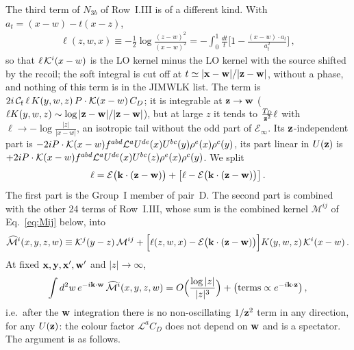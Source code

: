 The third term of $N_{3b}$ of Row~I.III is of a different kind. With $a_t=(x-w)-t(x-z)$,
\begin{align}\label{eq:ell}
\ell(z,w,x)\equiv-\frac12\log\frac{(z-w)^2}{(x-w)^2}=-\int_0^1\frac{dt}{t}\Big[1-\frac{(x-w)\cdot a_t}{a_t^2}\Big]\,,
\end{align}
so that $\ell\,\mathcal{K}^i(x-w)$ is the LO kernel minus the LO kernel with the source shifted by the recoil; the soft integral is cut off at $t\simeq|\mathbf{x}-\mathbf{w}|/|\mathbf{z}-\mathbf{w}|$, without a phase, and nothing of this term is in the JIMWLK list. The term is $2i\,\mathcal C_{\rm f}\,\ell\,K(y,w,z)\,P\cdot\mathcal{K}(x-w)\,C_D$; it is integrable at $\mathbf{z}\to\mathbf{w}$ ($\ell K(y,w,z)\sim\log|\mathbf{z}-\mathbf{w}|/|\mathbf{z}-\mathbf{w}|$), but at large $z$ it tends to $\frac{T_D}{\mathbf{z}^2}\ell$ with $\ell\to-\log\frac{|z|}{|x-w|}$, an isotropic tail without the odd part of $\mathcal E_\infty$. Its $\mathbf{z}$-independent part is $-2iP\cdot\mathcal{K}(x-w)f^{abd}\mathcal L^aU^{de}(x)U^{bc}(y)\rho^e(x)\rho^c(y)$, its part linear in $U(\mathbf{z})$ is $+2iP\cdot\mathcal{K}(x-w)f^{abd}\mathcal L^aU^{de}(x)U^{bc}(z)\rho^e(x)\rho^c(y)$. We split
\begin{align}
\ell=\mathcal E\big(\mathbf{k}\cdot(\mathbf{z}-\mathbf{w})\big)+\big[\ell-\mathcal E\big(\mathbf{k}\cdot(\mathbf{z}-\mathbf{w})\big)\big]\,.
\end{align}
The first part is the Group~I member of pair~D. The second part is combined with the other 24 terms of Row~I.III, whose sum is the combined kernel $\mathcal M^{ij}$ of Eq.~\eqref{eq:Mij} below, into
\begin{align}\label{eq:Mhat}
\widehat{\mathcal M}^i(x,y,z,w)\equiv\mathcal{K}^j(y-z)\,\mathcal M^{ij}+\Big[\ell(z,w,x)-\mathcal E\big(\mathbf{k}\cdot(\mathbf{z}-\mathbf{w})\big)\Big]K(y,w,z)\,\mathcal{K}^i(x-w)\,.
\end{align}
At fixed $\mathbf{x},\mathbf{y},\mathbf{x}',\mathbf{w}'$ and $|z|\to\infty$,
\begin{align}\label{eq:Mhatclaim}
\int d^2w\,e^{-i\mathbf{k}\cdot\mathbf{w}}\,\widehat{\mathcal M}^i(x,y,z,w)=O\Big(\frac{\log|z|}{|z|^3}\Big)+\big(\text{terms}\propto e^{-i\mathbf{k}\cdot\mathbf{z}}\big)\,,
\end{align}
i.e.\ after the $\mathbf{w}$ integration there is no non-oscillating $1/\mathbf{z}^2$ term in any direction, for any $U(\mathbf{z})$: the colour factor $\mathcal L^aC_D$ does not depend on $\mathbf{w}$ and is a spectator. The argument is as follows.

